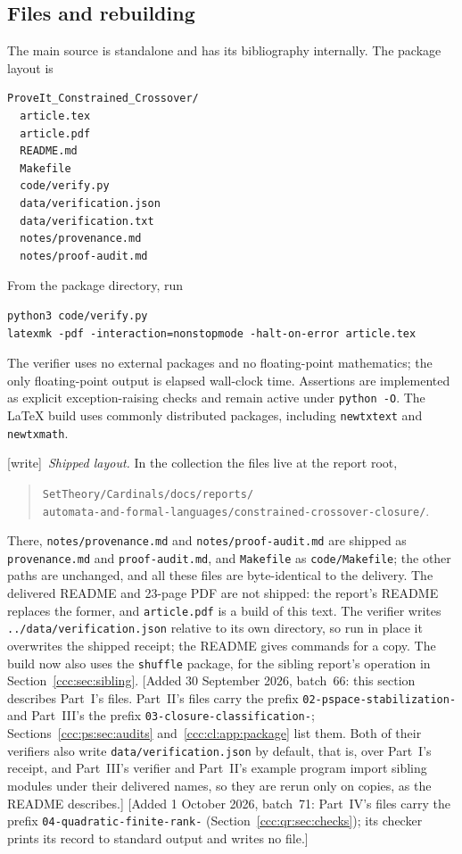 \documentclass[11pt,letterpaper]{article}
\theoremstyle{definition}
\theoremstyle{remark}
\newcommand{\wtag}{\textup{[write]}}
\newcommand{\wadd}[1]{\textup{[}Added 30 September 2026, batch~66: #1\textup{]}}
\newcommand{\waddsevone}[1]{\textup{[}Added 1 October 2026, batch~71: #1\textup{]}}
\begin{document}
\subsection{Files and rebuilding}

The main source is standalone and has its bibliography internally. The package
layout is
\begin{lstlisting}
ProveIt_Constrained_Crossover/
  article.tex
  article.pdf
  README.md
  Makefile
  code/verify.py
  data/verification.json
  data/verification.txt
  notes/provenance.md
  notes/proof-audit.md
\end{lstlisting}
From the package directory, run
\begin{lstlisting}
python3 code/verify.py
latexmk -pdf -interaction=nonstopmode -halt-on-error article.tex
\end{lstlisting}
The verifier uses no external packages and no floating-point mathematics;
the only floating-point output is elapsed wall-clock time. Assertions are
implemented as explicit exception-raising checks and remain active under
\texttt{python -O}. The LaTeX build uses commonly distributed packages,
including \texttt{newtxtext} and \texttt{newtxmath}.

\wtag\ \emph{Shipped layout.} In the collection the files live at the report
root,
\begin{quote}\small
\nolinkurl{SetTheory/Cardinals/docs/reports/}\\
\nolinkurl{automata-and-formal-languages/constrained-crossover-closure/}.
\end{quote}
There, \texttt{notes/provenance.md} and
\texttt{notes/proof-audit.md} are shipped as \texttt{provenance.md} and
\texttt{proof-audit.md}, and \texttt{Makefile} as \texttt{code/Makefile}; the
other paths are unchanged, and all these files are byte-identical to the
delivery. The delivered README and 23-page PDF are not shipped: the report's
README replaces the former, and \texttt{article.pdf} is a build of this text.
The verifier writes \texttt{../data/verification.json} relative to its own
directory, so run in place it overwrites the shipped receipt; the README gives
commands for a copy. The build now also uses the \texttt{shuffle} package, for
the sibling report's operation in Section~\ref{ccc:sec:sibling}.
\wadd{this section describes Part~I's files. Part~II's files carry the prefix
\texttt{02-pspace-stabilization-} and Part~III's the prefix
\texttt{03-closure-classification-}; Sections~\ref{ccc:ps:sec:audits}
and~\ref{ccc:cl:app:package} list them. Both of their verifiers also write
\texttt{data/verification.json} by default, that is, over Part~I's receipt,
and Part~III's verifier and Part~II's example program import sibling modules
under their delivered names, so they are rerun only on copies, as the README
describes.}
\waddsevone{Part~IV's files carry the prefix
\texttt{04-quadratic-finite-rank-} (Section~\ref{ccc:qr:sec:checks}); its
checker prints its record to standard output and writes no file.}
\end{document}
